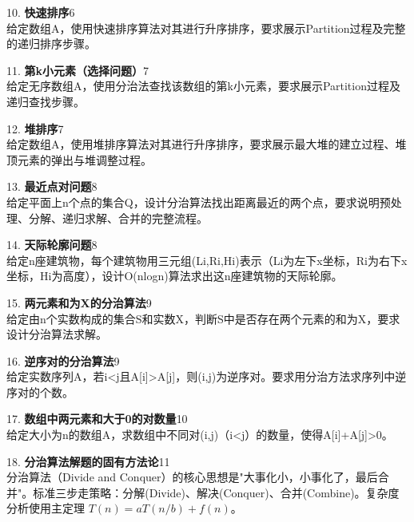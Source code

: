 \columnbreak
\vspace{8pt}
10. \textbf{快速排序}\hfill 6\\
给定数组A，使用快速排序算法对其进行升序排序，要求展示Partition过程及完整的递归排序步骤。

\vspace{8pt}
11. \textbf{第k小元素（选择问题）}\hfill 7\\
给定无序数组A，使用分治法查找该数组的第k小元素，要求展示Partition过程及递归查找步骤。

\vspace{8pt}
12. \textbf{堆排序}\hfill 7\\
给定数组A，使用堆排序算法对其进行升序排序，要求展示最大堆的建立过程、堆顶元素的弹出与堆调整过程。

\vspace{8pt}
13. \textbf{最近点对问题}\hfill 8\\
给定平面上n个点的集合Q，设计分治算法找出距离最近的两个点，要求说明预处理、分解、递归求解、合并的完整流程。

\vspace{8pt}
14. \textbf{天际轮廓问题}\hfill 8\\
给定n座建筑物，每个建筑物用三元组(Li,Ri,Hi)表示（Li为左下x坐标，Ri为右下x坐标，Hi为高度），设计O(nlogn)算法求出这n座建筑物的天际轮廓。

\vspace{8pt}
15. \textbf{两元素和为X的分治算法}\hfill 9\\
给定由n个实数构成的集合S和实数X，判断S中是否存在两个元素的和为X，要求设计分治算法求解。

\vspace{8pt}
16. \textbf{逆序对的分治算法}\hfill 9\\
给定实数序列A，若i<j且A[i]>A[j]，则(i,j)为逆序对。要求用分治方法求序列中逆序对的个数。

\vspace{8pt}
17. \textbf{数组中两元素和大于0的对数量}\hfill 10\\
给定大小为n的数组A，求数组中不同对(i,j)（i<j）的数量，使得A[i]+A[j]>0。

\vspace{8pt}
18. \textbf{分治算法解题的固有方法论}\hfill 11\\
分治算法（Divide and Conquer）的核心思想是"大事化小，小事化了，最后合并"。标准三步走策略：分解(Divide)、解决(Conquer)、合并(Combine)。复杂度分析使用主定理 $T(n) = aT(n/b) + f(n)$。
